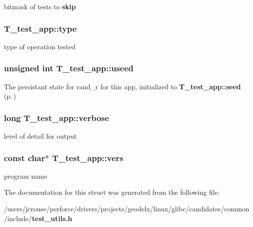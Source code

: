 bitmask of tests to {\bf skip} 
\subsubsection{ T\_\-test\_\-app::type}\label{structT__test__app_m0}


type of operation tested 
\subsubsection{\setlength{\rightskip}{0pt plus 5cm}unsigned int T\_\-test\_\-app::useed}\label{structT__test__app_m18}


The persistant state for rand\_\-r for this app, initialized to {\bf T\_\-test\_\-app::seed} {\rm (p.\,\pageref{structT__test__app_m11})} 
\subsubsection{\setlength{\rightskip}{0pt plus 5cm}long T\_\-test\_\-app::verbose}\label{structT__test__app_m9}


level of detail for output 
\subsubsection{\setlength{\rightskip}{0pt plus 5cm}const char$\ast$ T\_\-test\_\-app::vers}\label{structT__test__app_m2}


program name 

The documentation for this struct was generated from the following file:\begin{CompactItemize}
\item 
/users/jcrouse/perforce/drivers/projects/geodelx/linux/glibc/candidates/common/include/{\bf test\_\-utils.h}\end{CompactItemize}
